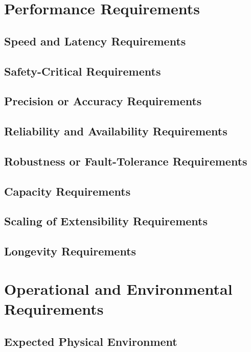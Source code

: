 \documentclass{scrreprt}
\begin{document}
\section{Performance Requirements}

\subsection{Speed and Latency Requirements}

\subsection{Safety-Critical Requirements}

\subsection{Precision or Accuracy Requirements}

\subsection{Reliability and Availability Requirements}

\subsection{Robustness or Fault-Tolerance Requirements}

\subsection{Capacity Requirements}

\subsection{Scaling of Extensibility Requirements}

\subsection{Longevity Requirements}

\section{Operational and Environmental Requirements}

\subsection{Expected Physical Environment}
\end{document}
